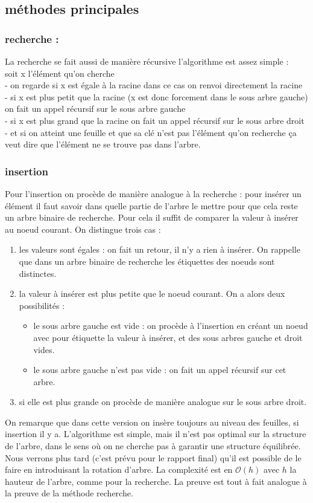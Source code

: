 \documentclass{report}
\begin{document}
\subsection{méthodes principales}
\subsubsection{recherche :} 
La recherche se fait aussi de manière récursive l'algorithme est assez simple :
\\soit x l'élément qu'on cherche
\\- on regarde si x est égale à la racine dans ce cas on renvoi directement la racine 
\\- si x est plus petit que la racine (x est donc forcement dans le sous arbre gauche) on fait un appel récursif sur le sous arbre gauche 
\\- si x est plus grand que la racine on fait un appel récursif sur le sous arbre droit 
\\- et si on atteint une feuille et que sa clé n'est pas l'élément qu'on recherche ça veut dire que l'élément ne se trouve pas dans l'arbre.
\subsubsection{insertion}
Pour l'insertion on procède de manière analogue à la recherche : pour insérer un élément il faut savoir dans quelle partie de l'arbre le mettre pour que cela reste un arbre binaire de recherche.
Pour cela il suffit de comparer la valeur à insérer au noeud courant. On distingue trois cas :
\begin{enumerate}
    \item les valeurs sont égales : on fait un retour, il n'y a rien à insérer. On rappelle que dans un arbre binaire de recherche les étiquettes des noeuds sont distinctes.
    \item la valeur à insérer est plus petite que le noeud courant. On a alors deux possibilités :
    \begin{itemize}
        \item le sous arbre gauche est vide : on procède à l'insertion en créant un noeud avec pour étiquette la valeur à insérer, et des sous arbres gauche et droit vides.
        \item le sous arbre gauche n'est pas vide : on fait un appel récursif sur cet arbre.
    \end{itemize}
    \item si elle est plus grande on procède de manière analogue sur le sous arbre droit.
\end{enumerate}
On remarque que dans cette version on insère toujours au niveau des feuilles, si insertion il y a. L'algorithme est simple, mais il n'est pas optimal sur la structure de l'arbre, dans le sens où on ne cherche pas à garantir une structure équilibrée. Nous verrons plus tard (c'est prévu pour le rapport final) qu'il est possible de le faire en introduisant la rotation d'arbre.
La complexité est en $\mathcal{O}(h)$ avec $h$ la hauteur de l'arbre, comme pour la recherche. La preuve est tout à fait analogue à la preuve de la méthode recherche.
\end{document}
